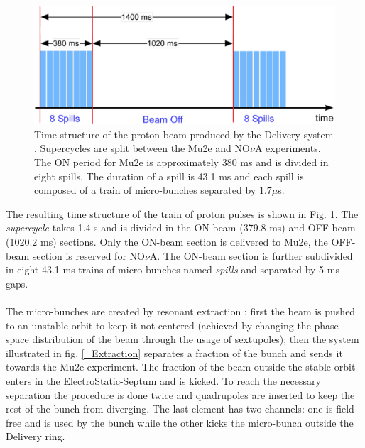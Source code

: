 \documentclass[12pt,a4paper,openright, oneside, titlepage]{book} %
\begin{document}
\begin{figure}[h!]
\centering
\includegraphics[scale=0.6]{beam_time_structure_2}
\caption[Mu2e proton beam time structure]{Time structure of the proton beam produced by the Delivery system \cite{BeamStruct}. 
Supercycles are split between the Mu2e and NO$\nu$A experiments. 
The ON period for Mu2e is approximately 380 ms and is divided in eight spills. 
The duration of a spill is 43.1 ms and each spill is composed of a train of micro-bunches 
separated by $1.7 \mu$s.}
\label{_beam_time_structure}
\end{figure}

\noindent
The resulting time structure of the train of proton pulses is shown in Fig. \ref{_beam_time_structure}.
The \textit{supercycle} takes 1.4 s and is divided in the ON-beam (379.8 ms) and OFF-beam (1020.2 ms) sections. 
Only the ON-beam section is delivered to Mu2e, the OFF-beam section is reserved for NO$\nu$A.
The ON-beam section is further subdivided in eight 43.1 ms trains of micro-bunches
named \textit{spills} and  separated by 5 ms gaps.\\ \\
The micro-bunches are created by resonant extraction \cite{Extraction}: 
first the beam is pushed to an unstable orbit to keep it not centered (achieved by changing the phase-space distribution of the beam through the usage of sextupoles); then the system illustrated in fig. \ref{_Extraction} separates a fraction of the bunch  and sends it towards the Mu2e experiment. 
The fraction of the beam outside the stable orbit enters in the ElectroStatic-Septum and is kicked. 
To reach the necessary separation the procedure is done twice and quadrupoles are inserted to keep the rest of the bunch from diverging.
The last element has two channels: one is field free and is used by the bunch while the other kicks the micro-bunch outside the Delivery ring.\\
\end{document}
